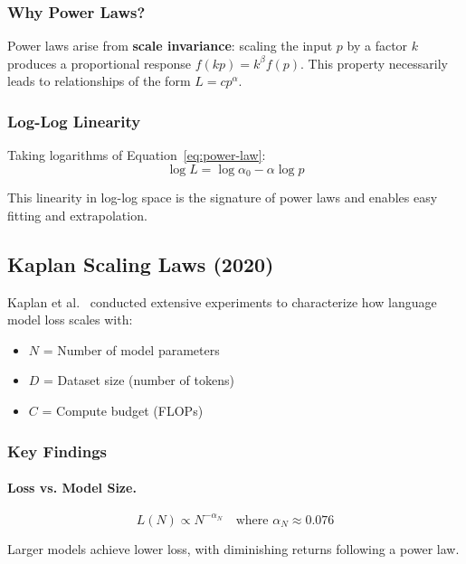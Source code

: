 \documentclass[class=article,crop=false]{standalone}
\begin{document}
\subsubsection{Why Power Laws?}

Power laws arise from \textbf{scale invariance}: scaling the input $p$ by a factor $k$ produces a proportional response $f(kp) = k^\beta f(p)$. This property necessarily leads to relationships of the form $L = cp^\alpha$.

\subsubsection{Log-Log Linearity}

Taking logarithms of Equation~\ref{eq:power-law}:
\begin{equation}
  \log L = \log \alpha_0 - \alpha \log p
\end{equation}

This linearity in log-log space is the signature of power laws and enables easy fitting and extrapolation.

\subsection{Kaplan Scaling Laws (2020)}
\label{sec:scaling:kaplan}

Kaplan et al.~\cite{kaplan2020} conducted extensive experiments to characterize how language model loss scales with:
\begin{itemize}
  \item $N$ = Number of model parameters
  \item $D$ = Dataset size (number of tokens)
  \item $C$ = Compute budget (FLOPs)
\end{itemize}

\subsubsection{Key Findings}

\paragraph{Loss vs. Model Size.}
\begin{equation}
  L(N) \propto N^{-\alpha_N} \quad \text{where } \alpha_N \approx 0.076
\end{equation}

Larger models achieve lower loss, with diminishing returns following a power law.
\end{document}
